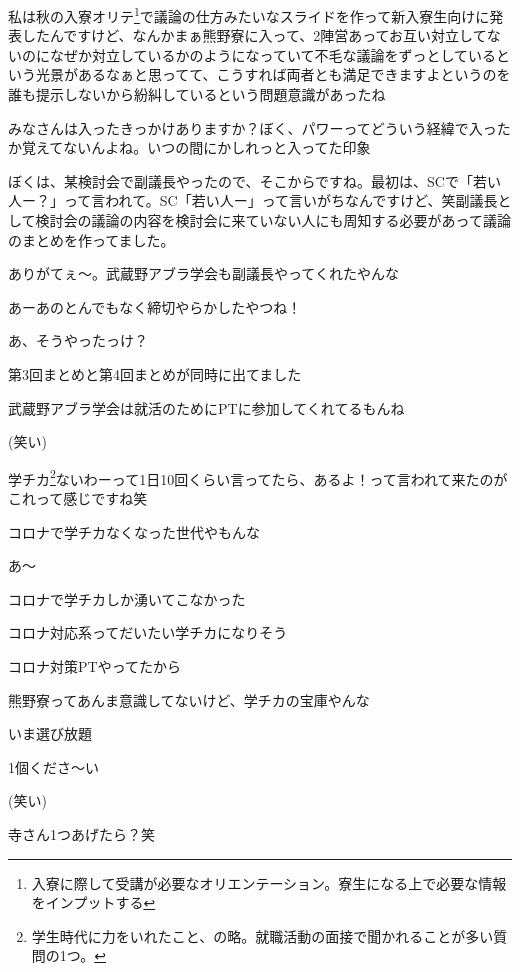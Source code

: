 \begin{multicols}{2}
私は秋の入寮オリテ\footnote{入寮に際して受講が必要なオリエンテーション。寮生になる上で必要な情報をインプットする}で議論の仕方みたいなスライドを作って新入寮生向けに発表したんですけど、なんかまぁ熊野寮に入って、2陣営あってお互い対立してないのになぜか対立しているかのようになっていて不毛な議論をずっとしているという光景があるなぁと思ってて、こうすれば両者とも満足できますよというのを誰も提示しないから紛糾しているという問題意識があったね

みなさんは入ったきっかけありますか？ぼく、パワーってどういう経緯で入ったか覚えてないんよね。いつの間にかしれっと入ってた印象

ぼくは、某検討会で副議長やったので、そこからですね。最初は、SCで「若い人ー？」って言われて。SC「若い人ー」って言いがちなんですけど、笑副議長として検討会の議論の内容を検討会に来ていない人にも周知する必要があって議論のまとめを作ってました。

ありがてぇ〜。武蔵野アブラ学会も副議長やってくれたやんな

あーあのとんでもなく締切やらかしたやつね！

あ、そうやったっけ？

第3回まとめと第4回まとめが同時に出てました

武蔵野アブラ学会は就活のためにPTに参加してくれてるもんね

(笑い)

学チカ\footnote{学生時代に力をいれたこと、の略。就職活動の面接で聞かれることが多い質問の1つ。}ないわーって1日10回くらい言ってたら、あるよ！って言われて来たのがこれって感じですね笑

コロナで学チカなくなった世代やもんな

あ〜

コロナで学チカしか湧いてこなかった

コロナ対応系ってだいたい学チカになりそう

コロナ対策PTやってたから

熊野寮ってあんま意識してないけど、学チカの宝庫やんな

いま選び放題

1個くださ〜い

(笑い)

寺さん1つあげたら？笑


\end{multicols}
